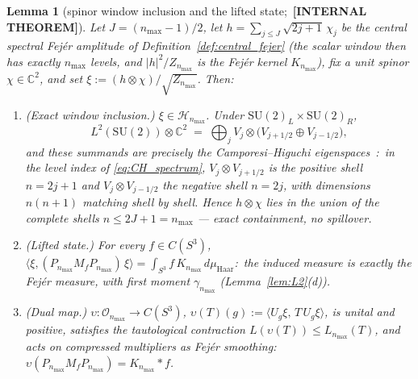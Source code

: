 \documentclass[11pt,a4paper]{article}
\theoremstyle{plain}
\newtheorem{lemma}[theorem]{Lemma}
\theoremstyle{definition}
\newcommand{\nmax}{n_{\max}}
\newcommand{\sthree}{S^{3}}
\newcommand{\Hilb}{\mathcal{H}}
\newcommand{\Op}{\mathcal{O}}
\newcommand{\C}{\mathbb{C}}
\newcommand{\SU}{\mathrm{SU}}
\newcommand{\KS}{K}
\begin{document}
\begin{lemma}[spinor window inclusion and the lifted state;\ \textbf{[INTERNAL THEOREM]}]
\label{lem:lifted_state}
Let $J = (\nmax - 1)/2$, let
$h = \sum_{j \le J} \sqrt{2j+1}\,\chi_j$ be the central spectral
Fej\'er amplitude of Definition~\ref{def:central_fejer} (the scalar
window then has exactly $\nmax$ levels, and $|h|^2 / Z_{\nmax}$ is
the Fej\'er kernel $\KS_{\nmax}$), fix a unit spinor $\chi \in
\C^2$, and set $\xi := (h \otimes \chi)/\sqrt{Z_{\nmax}}$. Then:
\begin{enumerate}\setlength{\itemsep}{2pt}
\item[(a)] (\emph{Exact window inclusion.}) $\xi \in \Hilb_{\nmax}$.
Under $\mathrm{SU}(2)_L \times \mathrm{SU}(2)_R$,
\begin{equation*}
L^2(\SU(2)) \otimes \C^2 \;=\; \bigoplus_{j} V_j \otimes
\bigl(V_{j+1/2} \oplus V_{j-1/2}\bigr),
\end{equation*}
and these summands are precisely the Camporesi--Higuchi
eigenspaces~\cite{camporesi_higuchi1996}:\ in the level index of
\eqref{eq:CH_spectrum}, $V_j \otimes V_{j+1/2}$ is the positive shell
$n = 2j + 1$ and $V_j \otimes V_{j-1/2}$ the negative shell $n = 2j$,
with dimensions $n(n+1)$ matching shell by shell. Hence $h \otimes
\chi$ lies in the union of the \emph{complete} shells $n \le 2J + 1 =
\nmax$ --- exact containment, no spillover.
\item[(b)] (\emph{Lifted state.}) For every $f \in C(\sthree)$,
$\langle \xi, (P_{\nmax} M_f P_{\nmax})\,\xi\rangle =
\int_{\sthree} f\, \KS_{\nmax}\, d\mu_{\mathrm{Haar}}$:\ the induced
measure is exactly the Fej\'er measure, with first moment
$\gamma_{\nmax}$ (Lemma~\ref{lem:L2}(d)).
\item[(c)] (\emph{Dual map.}) $\upsilon : \Op_{\nmax} \to
C(\sthree)$, $\upsilon(T)(g) := \langle U_g \xi,\, T\, U_g
\xi\rangle$, is unital and positive, satisfies the tautological
contraction $L(\upsilon(T)) \le L_{\nmax}(T)$, and acts on compressed
multipliers as Fej\'er smoothing:\
$\upsilon(P_{\nmax} M_f P_{\nmax}) = \KS_{\nmax} * f$.
\end{enumerate}
\end{lemma}
\end{document}
